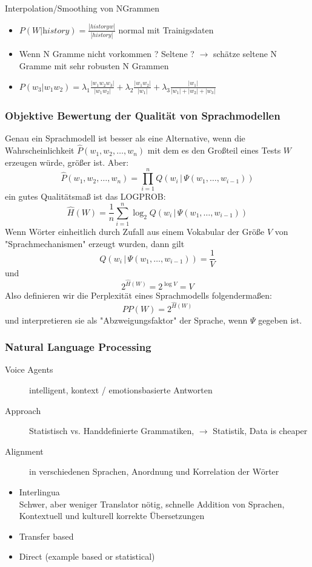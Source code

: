 Interpolation/Smoothing von NGrammen
\begin{itemize}
	\item $P(W|\textit{history}) = \frac{|history w|}{|history|}$ normal mit Trainigsdaten
	\item Wenn N Gramme nicht vorkommen ? Seltene ? $\to$ schätze seltene N Gramme mit sehr robusten N Grammen
	\item $P(w_3 | w_1 w_2) = \lambda_1 \frac{|w_1 w_2 w_3|}{|w_1 w_2|} + \lambda_2 \frac{|w_1 w_2|}{|w_1|} + \lambda_3 \frac{|w_1|}{|w_1| + |w_2| + |w_3|}$
\end{itemize}

\subsubsection*{Objektive Bewertung der Qualität von Sprachmodellen}

Genau ein Sprachmodell ist besser als eine Alternative, wenn die Wahrscheinlichkeit $\hat{P}(w_1,w_2,\dots ,w_n)$ mit dem es den Großteil eines Tests $W$ erzeugen würde, größer ist. Aber:
$$\hat{P}(w_1,w_2,\dots ,w_n) = \prod\limits_{i=1}^n Q(w_i \, | \, \Psi(w_1,\dots,w_{i-1}))$$
ein gutes Qualitätsmaß ist das LOGPROB:
$$\hat{H}(W) = \frac{1}{n} \sum\limits_{i=1}^n \log_2 Q(w_i \, | \, \Psi(w_1,\dots,w_{i-1}))$$
Wenn Wörter einheitlich durch Zufall aus einem Vokabular der Größe $V$ von "{}Sprachmechanismen"{} erzeugt wurden, dann gilt
$$Q(w_i \, | \, \Psi(w_1,\dots,w_{i-1})) = \frac{1}{V}$$ und $$2^{\hat{H}(W)} = 2^{\log V} = V$$
Also definieren wir die Perplexität eines Sprachmodells folgendermaßen: $$PP(W) = 2^{\hat{H}(W)}$$
und interpretieren sie als "{}Abzweigungsfaktor"{} der Sprache, wenn $\Psi$ gegeben ist.

\subsubsection{Natural Language Processing}

\begin{description}
	\item[Voice Agents] intelligent, kontext / emotionsbasierte Antworten
	\item[Approach] Statistisch vs. Handdefinierte Grammatiken, $\to$ Statistik, Data is cheaper
	\item[Alignment] in verschiedenen Sprachen, Anordnung und Korrelation der Wörter
\end{description}

\begin{itemize}
	\item Interlingua \\
	Schwer, aber weniger Translator nötig, schnelle Addition von Sprachen, Kontextuell und kulturell korrekte Übersetzungen
	\item Transfer based
	\item Direct (example based or statistical)
\end{itemize}

